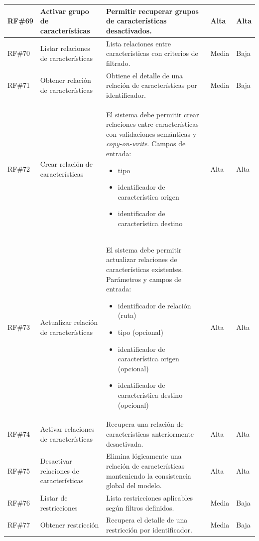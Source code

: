 \begin{longtable}{|p{1cm}|p{4cm}|p{5.2cm}|p{1.9cm}|p{1.9cm}|}
	\hline
	\rowcolor[HTML]{EDEBF1}
	\ac{RF}\#69 & Activar grupo de características & Permitir recuperar grupos de características desactivados. & Alta & Alta \\
	\hline
	\ac{RF}\#70 & Listar relaciones de características & Lista relaciones entre características con criterios de filtrado. & Media & Baja \\
	\hline
	\rowcolor[HTML]{EDEBF1}
	\ac{RF}\#71 & Obtener relación de características & Obtiene el detalle de una relación de características por identificador. & Media & Baja \\
	\hline
	\ac{RF}\#72 & Crear relación de características & El sistema debe permitir crear relaciones entre características con validaciones semánticas y \textit{copy-on-write}. Campos de entrada:
		\begin{itemize}
			\item tipo
			\item identificador de característica origen
			\item identificador de característica destino
		\end{itemize}
	& Alta & Alta \\
	\hline
	\rowcolor[HTML]{EDEBF1}
	\ac{RF}\#73 & Actualizar relación de características & El sistema debe permitir actualizar relaciones de características existentes. Parámetros y campos de entrada:
		\begin{itemize}
			\item identificador de relación (ruta)
			\item tipo (opcional)
			\item identificador de característica origen (opcional)
			\item identificador de característica destino (opcional)
		\end{itemize}
	& Alta & Alta \\
	\hline
	\ac{RF}\#74 & Activar relaciones de características & Recupera una relación de características anteriormente desactivada. & Alta & Alta \\
	\hline
	\rowcolor[HTML]{EDEBF1}
	\ac{RF}\#75 & Desactivar relaciones de características & Elimina lógicamente una relación de características manteniendo la consistencia global del modelo. & Alta & Alta \\
	\hline
	\ac{RF}\#76 & Listar de restricciones & Lista restricciones aplicables según filtros definidos. & Media & Baja \\
	\hline
	\rowcolor[HTML]{EDEBF1}
	\ac{RF}\#77 & Obtener restricción & Recupera el detalle de una restricción por identificador. & Media & Baja \\

\end{longtable}
